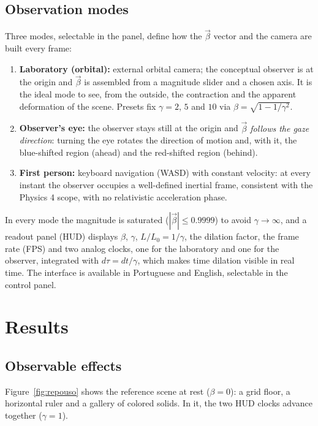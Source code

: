 \documentclass[10pt,a4paper,twocolumn]{article}
\begin{document}
\subsection{Observation modes}

Three modes, selectable in the panel, define how the $\vec{\beta}$ vector and the camera
are built every frame:

\begin{enumerate}
  \item \textbf{Laboratory (orbital):} external orbital camera; the conceptual observer
        is at the origin and $\vec{\beta}$ is assembled from a magnitude slider and a
        chosen axis. It is the ideal mode to see, from the outside, the contraction and
        the apparent deformation of the scene. Presets fix $\gamma = 2$, $5$ and $10$ via
        $\beta = \sqrt{1 - 1/\gamma^{2}}$.
  \item \textbf{Observer's eye:} the observer stays still at the origin and
        \emph{$\vec{\beta}$ follows the gaze direction}: turning the eye rotates the
        direction of motion and, with it, the blue-shifted region (ahead) and the
        red-shifted region (behind).
  \item \textbf{First person:} keyboard navigation (WASD) with constant velocity: at
        every instant the observer occupies a well-defined inertial frame, consistent
        with the Physics 4 scope, with no relativistic acceleration phase.
\end{enumerate}

In every mode the magnitude is saturated ($|\vec{\beta}| \leq 0.9999$) to avoid
$\gamma \to \infty$, and a readout panel (HUD) displays $\beta$, $\gamma$,
$L/L_{0} = 1/\gamma$, the dilation factor, the frame rate (FPS) and two analog clocks,
one for the laboratory and one for the observer, integrated with $d\tau = dt/\gamma$,
which makes time dilation visible in real time. The interface is available in Portuguese
and English, selectable in the control panel.

\section{Results}

\subsection{Observable effects}

Figure~\ref{fig:repouso} shows the reference scene at rest ($\beta = 0$): a grid floor, a
horizontal ruler and a gallery of colored solids. In it, the two HUD clocks advance
together ($\gamma = 1$).
\end{document}
